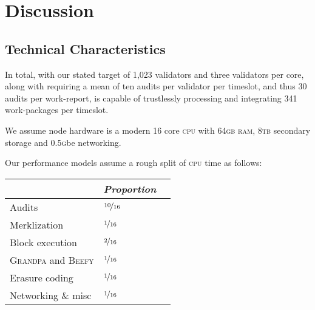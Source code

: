 \section{Discussion}\label{sec:discussion}




\subsection{Technical Characteristics}

In total, with our stated target of 1,023 validators and three validators per core, along with requiring a mean of ten audits per validator per timeslot, and thus 30 audits per work-report, \Jam is capable of trustlessly processing and integrating 341 work-packages per timeslot.

We assume node hardware is a modern 16 core \textsc{cpu} with 64\textsc{gb} \textsc{ram}, 8\textsc{tb} secondary storage and 0.5\textsc{g}be networking.

Our performance models assume a rough split of \textsc{cpu} time as follows:

\begin{center}
  \begin{tabular}[h]{@{}lll@{}}
    \toprule
    & \emph{Proportion} \\
    \midrule
    Audits & $\nicefrac{10}{16}$ \\
    Merklization & $\nicefrac{1}{16}$ \\
    Block execution & $\nicefrac{2}{16}$ \\
    \textsc{Grandpa} and \textsc{Beefy} & $\nicefrac{1}{16}$ \\
    Erasure coding & $\nicefrac{1}{16}$ \\
    Networking \& misc & $\nicefrac{1}{16}$ \\
    \bottomrule
  \end{tabular}
\end{center}

